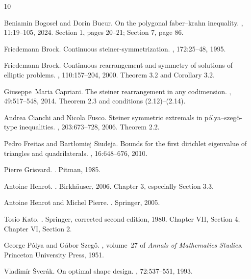 \documentclass[11pt,a4paper]{article}
\theoremstyle{proofmanuscript}
\begin{document}
\clearpage
\begin{thebibliography}{10}

Beniamin Bogosel and Dorin Bucur.
\newblock On the polygonal faber--krahn inequality.
,
  11:19--105, 2024.
\newblock Section 1, pages 20--21; Section 7, page 86.

Friedemann Brock.
\newblock Continuous steiner-symmetrization.
, 172:25--48, 1995.

Friedemann Brock.
\newblock Continuous rearrangement and symmetry of solutions of elliptic
  problems.
, 110:157--204, 2000.
\newblock Theorem 3.2 and Corollary 3.2.

Giuseppe~Maria Capriani.
\newblock The steiner rearrangement in any codimension.
,
  49:517--548, 2014.
\newblock Theorem 2.3 and conditions (2.12)--(2.14).

Andrea Cianchi and Nicola Fusco.
\newblock Steiner symmetric extremals in pólya--szegö-type inequalities.
, 203:673--728, 2006.
\newblock Theorem 2.2.

Pedro Freitas and Bartłomiej Siudeja.
\newblock Bounds for the first dirichlet eigenvalue of triangles and
  quadrilaterals.
,
  16:648--676, 2010.

Pierre Grisvard.
.
\newblock Pitman, 1985.

Antoine Henrot.
.
\newblock Birkhäuser, 2006.
\newblock Chapter 3, especially Section 3.3.

Antoine Henrot and Michel Pierre.
.
\newblock Springer, 2005.

Tosio Kato.
.
\newblock Springer, corrected second edition, 1980.
\newblock Chapter VII, Section 4; Chapter VI, Section 2.

George Pólya and Gábor Szegő.
, volume~27
  of {\em Annals of Mathematics Studies}.
\newblock Princeton University Press, 1951.

Vladimír Šverák.
\newblock On optimal shape design.
, 72:537--551,
  1993.

\end{thebibliography}
\end{document}
